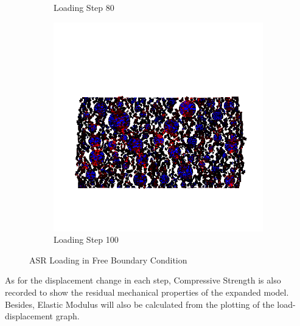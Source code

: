 \begin{figure}[ht]
\begin{subfigure}{.33\textwidth}
      \caption{Loading Step 80}
      \end{subfigure}%
      \begin{subfigure}{.33\textwidth}
        \centering
        \includegraphics[width=1.0\linewidth]{Files/A30P75_3_IS_Free/DEP50-STEP(120).png}
        \caption{Loading Step 100}
      \end{subfigure}

  \caption{ASR Loading in Free Boundary Condition}
  \label{fig:ASR_Loading_free}
\end{figure}


As for the displacement change in each step, Compressive Strength is also recorded to show the residual mechanical properties of the expanded model. Besides, Elastic Modulus will also be calculated from the plotting of the load-displacement graph.

\clearpage










